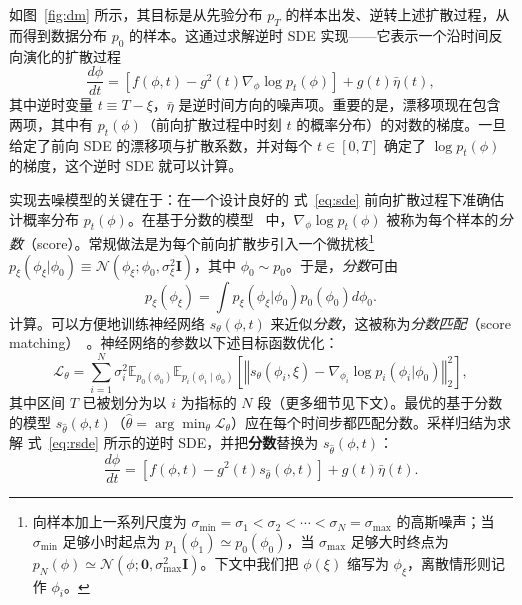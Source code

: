 如图~\ref{fig:dm} 所示，其目标是从先验分布 $p_T$ 的样本出发、逆转上述扩散过程，从而得到数据分布 $p_0$ 的样本。这通过求解逆时 SDE 实现——它表示一个沿时间反向演化的扩散过程~\cite{anderson:1982reversetime}
\begin{equation}
  \frac{d\phi}{dt} = \left[ f(\phi, t) - g^2(t)\nabla_{\phi}\log p_t(\phi) \right]
  + g(t) \bar{\eta}(t),
  \label{eq:rsde}
\end{equation}
其中逆时变量 $t \equiv T-\xi$，$\bar{\eta}$ 是逆时间方向的噪声项。重要的是，漂移项现在包含两项，其中有 $p_t(\phi)$（前向扩散过程中时刻 $t$ 的概率分布）的对数的梯度。一旦给定了前向 SDE 的漂移项与扩散系数，并对每个 $t\in[0, T]$ 确定了 $\log p_t(\phi)$ 的梯度，这个逆时 SDE 就可以计算。


实现去噪模型的关键在于：在一个设计良好的 式~\eqref{eq:sde} 前向扩散过程下准确估计概率分布 $p_t(\phi)$。在基于分数的模型~\cite{NEURIPS2019_3001ef25,song2021scorebased} 中，$\nabla_{\phi}\log p_t(\phi)$ 被称为每个样本的\textit{分数}（score）。常规做法是为每个前向扩散步引入一个微扰核\footnote{向样本加上一系列尺度为 $\sigma_\text{min} = \sigma_1<\sigma_2<\cdots<\sigma_N = \sigma_\text{max}$ 的高斯噪声；当 $\sigma_\text{min}$ 足够小时起点为 $p_1(\phi_1)\simeq p_0(\phi_0)$，当 $\sigma_\text{max}$ 足够大时终点为 $p_N(\phi)\simeq \mathcal{N}(\phi ; \mathbf{0}, \sigma_\text{max}^2 \mathbf{I})$。下文中我们把 $\phi(\xi)$ 缩写为 $\phi_\xi$，离散情形则记作 $\phi_i$。}
$p_\xi(\phi_\xi | \phi_0)  \equiv \mathcal{N}(\phi_\xi ; \phi_0, \sigma_\xi^2 \mathbf{I})$，其中 $\phi_0\sim p_0 $。于是，\textit{分数}可由
%
\begin{equation}
    p_{\xi}(\phi_\xi) = \int p_{\xi}(\phi_\xi|\phi_0) p_0(\phi_0) d\phi_0.
\end{equation}
%
计算。可以方便地训练神经网络 $s_\theta(\phi,t)$ 来近似\textit{分数}，这被称为\textit{分数匹配}（score matching）~\cite{Aapo:2005scb,Vincent:2011scb}。神经网络的参数以下述目标函数优化：
\begin{equation}
    \mathcal{L}_{\theta}= \sum_{i=1}^{N}\sigma_{i}^{2}\mathbb{E}_{p_0(\phi_0)}\mathbb{E}_{p_i(\phi_i\mid\phi_0)}
    \left[ \left\Vert s_\theta(\phi_i,\xi)-\nabla_{\phi_i}\log p_i(\phi_i|\phi_0)\right\Vert_{2}^{2}
    \right],
    \label{eq:objective}
\end{equation}
其中区间 $T$ 已被划分为以 $i$ 为指标的 $N$ 段（更多细节见下文）。最优的基于分数的模型 $s_{\hat{\theta}}(\phi,t)$（$\hat{\theta}=\arg\operatorname*{min}_{\theta}\mathcal{L}_{\theta}$）应在每个时间步都匹配分数。采样归结为求解 式~\eqref{eq:rsde} 所示的逆时 SDE，并把\textbf{分数}替换为 $s_{\hat{\theta}}(\phi,t)$：
\begin{equation}
  \frac{d\phi}{dt} = \left[ f(\phi, t) - g^2(t)s_{\hat{\theta}}(\phi,t) \right] + g(t) \bar{\eta}(t).
\end{equation}

